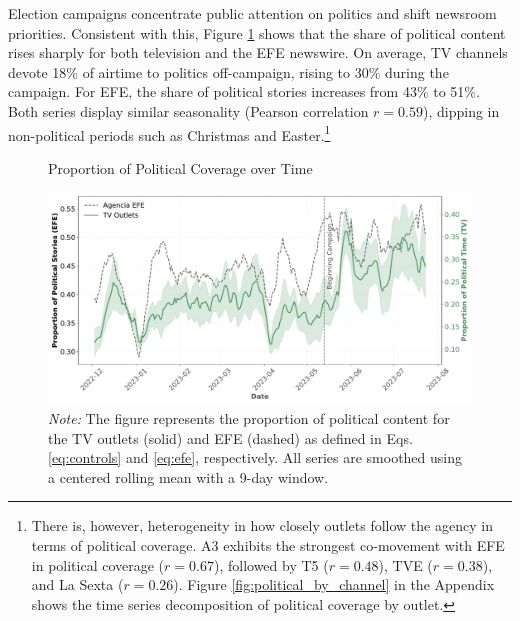 \documentclass[12pt]{article}
\begin{document}
		
	
	
Election campaigns concentrate public attention on politics and shift newsroom priorities. Consistent with this, Figure \ref{fig:coverage} shows that the share of political content rises sharply for both television and the EFE newswire. On average, TV channels devote 18\% of airtime to politics off-campaign, rising to 30\% during the campaign. For EFE, the share of political stories increases from 43\% to 51\%. Both series display similar seasonality (Pearson correlation  $r=0.59$), dipping in non-political periods such as Christmas and Easter.\footnote{	There is, however, heterogeneity in how closely outlets follow the agency in terms of political coverage. A3 exhibits the strongest co-movement with EFE in political coverage ($r=0.67$), followed by T5 ($r=0.48$), TVE ($r=0.38$), and La Sexta ($r=0.26$). Figure \ref{fig:political_by_channel} in the Appendix shows the time series decomposition of political coverage by outlet.}
	

	
	
		
	\begin{figure}[!htb]
		\caption{Proportion of Political Coverage over Time}
		\centering
				\includegraphics[width=150mm]{figures/political_words_both}
		\caption*{\small \textit{Note:} The figure represents the proportion of political content for the TV outlets (solid) and  EFE (dashed) as defined in Eqs. \eqref{eq:controls} and \eqref{eq:efe}, respectively. All series are smoothed using a centered rolling mean with a 9-day window.}
		\label{fig:coverage}
	\end{figure}
	

	
	

	

 
\end{document}
